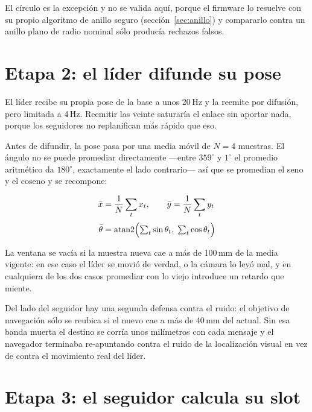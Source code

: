 \documentclass[11pt,a4paper]{article}
\theoremstyle{plain}
\begin{document}
El círculo es la excepción y no se valida aquí, porque el firmware lo resuelve
con su propio algoritmo de anillo seguro (sección~\ref{sec:anillo}) y
compararlo contra un anillo plano de radio nominal sólo producía rechazos
falsos.

\section{Etapa 2: el líder difunde su pose}

El líder recibe su propia pose de la base a unos 20\,Hz y la reemite por
difusión, pero limitada a 4\,Hz. Reemitir las veinte saturaría el enlace sin
aportar nada, porque los seguidores no replanifican más rápido que eso.

Antes de difundir, la pose pasa por una media móvil de $N = 4$ muestras. El
ángulo no se puede promediar directamente ---entre $359^\circ$ y $1^\circ$ el
promedio aritmético da $180^\circ$, exactamente el lado contrario--- así que se
promedian el seno y el coseno y se recompone:

\begin{align}
  \bar{x} &= \frac{1}{N}\sum_t x_t,
  \qquad
  \bar{y} = \frac{1}{N}\sum_t y_t
  \label{eq:media-pos}\\[2pt]
  \bar{\theta} &= \operatorname{atan2}
     \Bigl(\textstyle\sum_t \sin\theta_t,\; \sum_t \cos\theta_t\Bigr)
  \label{eq:media-ang}
\end{align}

La ventana se vacía si la muestra nueva cae a más de 100\,mm de la media
vigente: en ese caso el líder se movió de verdad, o la cámara lo leyó mal, y en
cualquiera de los dos casos promediar con lo viejo introduce un retardo que
miente.

Del lado del seguidor hay una segunda defensa contra el ruido: el objetivo de
navegación sólo se reubica si el nuevo cae a más de 40\,mm del actual. Sin esa
banda muerta el destino se corría unos milímetros con cada mensaje y el
navegador terminaba re-apuntando contra el ruido de la localización visual en
vez de contra el movimiento real del líder.

\section{Etapa 3: el seguidor calcula su slot}
\end{document}
